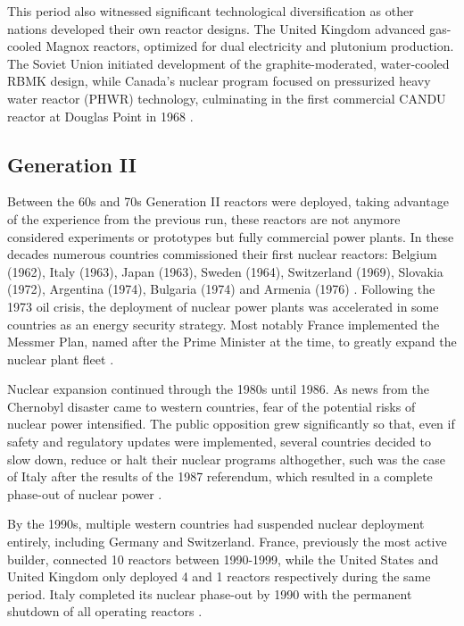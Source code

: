 This period also witnessed significant technological diversification as other nations developed their own reactor designs. The United Kingdom advanced gas-cooled Magnox reactors, optimized for dual electricity and plutonium production. The Soviet Union initiated development of the graphite-moderated, water-cooled RBMK design, while Canada's nuclear program focused on pressurized heavy water reactor (PHWR) technology, culminating in the first commercial CANDU reactor at Douglas Point in 1968 \cite{IAEA_PRIS_2025}.


\subsection{Generation II}
Between the 60s and 70s Generation II reactors were deployed, taking advantage of the experience from the previous run, these reactors are not anymore considered experiments or prototypes but fully commercial power plants. In these decades numerous countries commissioned their first nuclear reactors: Belgium (1962), Italy (1963), Japan (1963), Sweden (1964), Switzerland (1969), Slovakia (1972), Argentina (1974), Bulgaria (1974) and Armenia (1976) \cite{IAEA_PRIS_2025}. Following the 1973 oil crisis, the deployment of nuclear power plants was accelerated in some countries as an energy security strategy. Most notably France implemented the Messmer Plan, named after the Prime Minister at the time, to greatly expand the nuclear plant fleet \cite{FundingUniverse_EDF_History_2025}. 

Nuclear expansion continued through the 1980s until 1986. As news from the Chernobyl disaster came to western countries, fear of the potential risks of nuclear power intensified. The public opposition grew significantly so that, even if safety and regulatory updates were implemented, several countries decided to slow down, reduce or halt their nuclear programs althogether, such was the case of Italy after the results of the 1987 referendum, which resulted in a complete phase-out of nuclear power \cite{MinisteroInterno_Referendum_1987, IAEA_PRIS_2025}. 

By the 1990s, multiple western countries had suspended nuclear deployment entirely, including Germany and Switzerland. France, previously the most active builder, connected 10 reactors between 1990-1999, while the United States and United Kingdom only deployed 4 and 1 reactors respectively during the same period. Italy completed its nuclear phase-out by 1990 with the permanent shutdown of all operating reactors \cite{IAEA_PRIS_2025}. 

